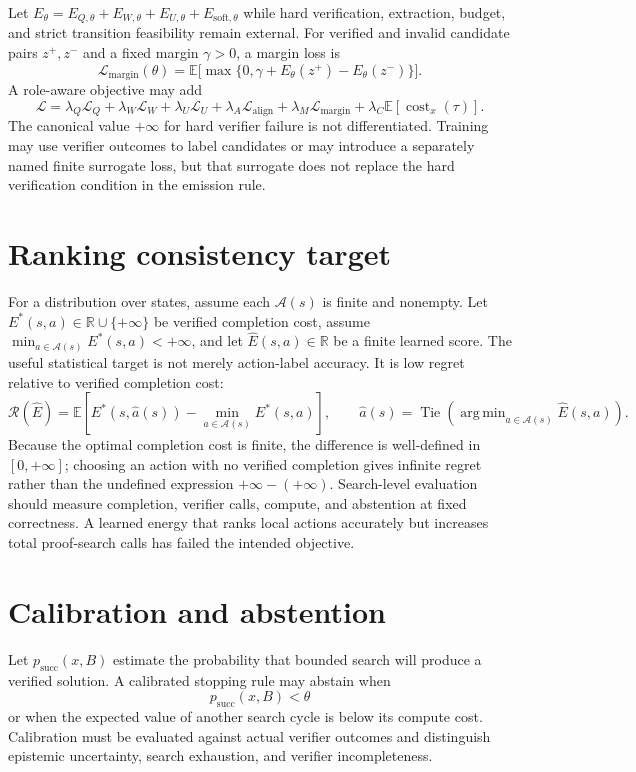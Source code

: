 \documentclass[11pt,oneside]{book}
\theoremstyle{remark}
\DeclareMathOperator*{\argmin}{arg\,min}
\DeclareMathOperator{\cost}{cost}
\begin{document}
Let
$E_\theta=E_{Q,\theta}+E_{W,\theta}+E_{U,\theta}
+E_{\mathrm{soft},\theta}$
while hard verification, extraction, budget, and strict transition feasibility
remain external. For verified and invalid candidate pairs $z^+,z^-$ and a
fixed margin $\gamma>0$, a margin loss is
\[
\mathcal L_{\mathrm{margin}}(\theta)
=\mathbb E\bigl[\max\{0,\gamma+E_\theta(z^+)-E_\theta(z^-)\}\bigr].
\]
A role-aware objective may add
\[
\mathcal L=\lambda_Q\mathcal L_Q+\lambda_W\mathcal L_W
+\lambda_U\mathcal L_U+\lambda_A\mathcal L_{\mathrm{align}}
+\lambda_M\mathcal L_{\mathrm{margin}}
+\lambda_C\mathbb E[\cost_x(\tau)].
\]
The canonical value $+\infty$ for hard verifier failure is not differentiated.
Training may use verifier outcomes to label candidates or may introduce a
separately named finite surrogate loss, but that surrogate does not replace
the hard verification condition in the emission rule.

\section{Ranking consistency target}

For a distribution over states, assume each $\mathcal A(s)$ is finite and
nonempty. Let
$E^*(s,a)\in\mathbb R\cup\{+\infty\}$ be verified completion cost, assume
$\min_{a\in\mathcal A(s)}E^*(s,a)<+\infty$, and let
$\widehat E(s,a)\in\mathbb R$ be a finite learned score. The useful statistical
target is not merely action-label accuracy. It is low regret relative to
verified completion cost:
\[
\mathcal R(\widehat E)
=\mathbb E\left[E^*(s,\widehat a(s))-
\min_{a\in\mathcal A(s)}E^*(s,a)\right],
\qquad
\widehat a(s)=\operatorname{Tie}\!\left(
\argmin_{a\in\mathcal A(s)}\widehat E(s,a)\right).
\]
Because the optimal completion cost is finite, the difference is
well-defined in $[0,+\infty]$; choosing an action with no verified completion
gives infinite regret rather than the undefined expression
$+\infty-(+\infty)$.
Search-level evaluation should measure completion, verifier calls, compute, and abstention at fixed correctness. A learned energy that ranks local actions accurately but increases total proof-search calls has failed the intended objective.

\section{Calibration and abstention}

Let $p_{\mathrm{succ}}(x,B)$ estimate the probability that bounded search will produce a verified solution. A calibrated stopping rule may abstain when
\[
p_{\mathrm{succ}}(x,B)<\theta
\]
or when the expected value of another search cycle is below its compute cost. Calibration must be evaluated against actual verifier outcomes and distinguish epistemic uncertainty, search exhaustion, and verifier incompleteness.
\end{document}
